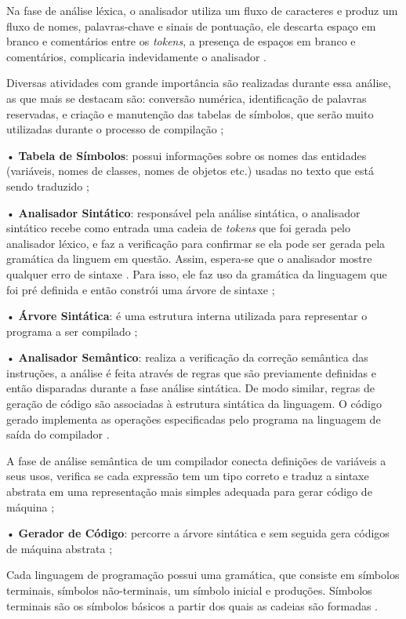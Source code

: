 \documentclass{bcc}
\begin{document}
Na fase de análise léxica, o analisador utiliza um fluxo de caracteres e produz um fluxo de nomes, palavras-chave e sinais de pontuação, ele descarta espaço em branco e comentários entre os \textit{tokens}, a presença de espaços em branco e comentários, complicaria indevidamente o analisador \cite{andrew2002}.

Diversas atividades com grande importância são realizadas durante essa análise, as que mais se destacam são: conversão numérica, identificação de palavras reservadas, e criação e manutenção das tabelas de símbolos, que serão muito utilizadas durante o processo de compilação \cite{neto2017};

• \textbf{Tabela de Símbolos}: possui informações sobre os nomes das entidades (variáveis, nomes de classes, nomes de objetos etc.) usadas no texto que está sendo traduzido \cite{somerville2003};

• \textbf{Analisador Sintático}: responsável pela análise sintática, o analisador sintático recebe como entrada uma cadeia de \textit{tokens} que foi gerada pelo analisador léxico, e faz a verificação para confirmar se ela pode ser gerada pela gramática da linguem em questão. Assim, espera-se que o analisador mostre qualquer erro de sintaxe \cite{aho2007}. Para isso, ele faz uso da gramática da linguagem que foi pré definida e então constrói uma árvore de sintaxe \cite{somerville2003};

• \textbf{Árvore Sintática}: é uma estrutura interna utilizada para representar o programa a ser compilado \cite{somerville2003};

• \textbf{Analisador Semântico}: realiza a verificação da correção semântica das instruções, a análise é feita através de regras que são previamente definidas e então disparadas durante a fase análise sintática. De modo similar, regras de geração de código são associadas à estrutura sintática da linguagem. O código gerado implementa as operações especificadas pelo programa na linguagem de saída do compilador \cite{barbosa2009}.

A fase de análise semântica de um compilador conecta definições de variáveis a seus usos, verifica se cada expressão tem um tipo correto e traduz a sintaxe abstrata em uma representação mais simples adequada para gerar código de máquina \cite{andrew2002};

• \textbf{Gerador de Código}: percorre a árvore sintática e sem seguida gera códigos de máquina abstrata \cite{somerville2003};

Cada linguagem de programação possui uma gramática, que consiste em símbolos terminais, símbolos não-terminais, um símbolo inicial e produções. Símbolos terminais são os símbolos básicos a partir dos
quais as cadeias são formadas \cite{ferreira2015}.
\end{document}
